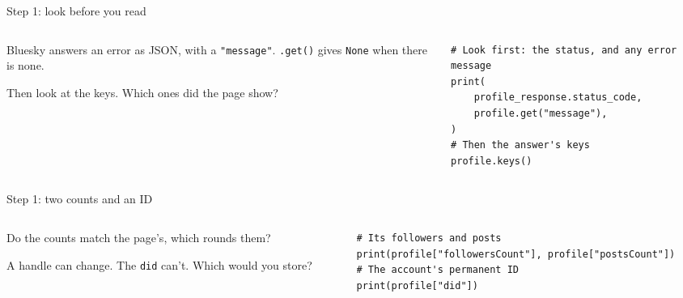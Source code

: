 \documentclass[9pt,aspectratio=169]{beamer}
\begin{document}
\begin{frame}[fragile]{Step 1: look before you read}
    \begin{columns}[T]
        \begin{column}{0.37\textwidth}
            Bluesky answers an error as JSON, with a \texttt{"message"}. \texttt{.get()} gives \texttt{None} when there is none.

            \medskip
            Then look at the keys. Which ones did the page show?
        \end{column}
        \begin{column}{0.6\textwidth}
\begin{lstlisting}
# Look first: the status, and any error message
print(
    profile_response.status_code,
    profile.get("message"),
)
# Then the answer's keys
profile.keys()
\end{lstlisting}
        \end{column}
    \end{columns}
\end{frame}

\begin{frame}[fragile]{Step 1: two counts and an ID}
    \begin{columns}[T]
        \begin{column}{0.37\textwidth}
            Do the counts match the page's, which rounds them?

            \medskip
            A handle can change. The \texttt{did} can't. Which would you store?
        \end{column}
        \begin{column}{0.6\textwidth}
\begin{lstlisting}
# Its followers and posts
print(profile["followersCount"], profile["postsCount"])
# The account's permanent ID
print(profile["did"])
\end{lstlisting}
        \end{column}
    \end{columns}
\end{frame}
\end{document}
